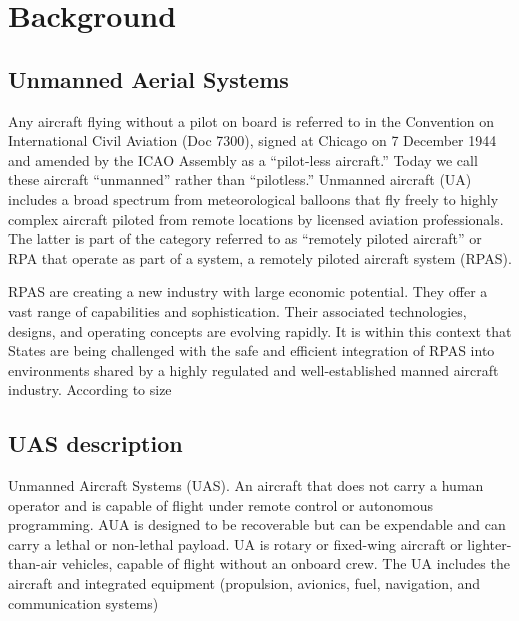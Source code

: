 \section{Background}
\subsection{Unmanned Aerial Systems}
Any aircraft flying without a pilot on board is referred to in the Convention on International Civil Aviation (Doc 7300), signed at Chicago on 7 December 1944 and amended by the ICAO Assembly as a “pilot-less aircraft.” Today we call these aircraft “unmanned” rather than “pilotless.” Unmanned aircraft (UA) includes a broad spectrum from meteorological balloons that fly freely to highly complex aircraft piloted from remote locations by licensed aviation professionals. The latter is part of the category referred to as “remotely piloted aircraft” or RPA that operate as part of a system, a remotely piloted aircraft system (RPAS).

RPAS are creating a new industry with large economic potential. They offer a vast range of capabilities and sophistication. Their associated technologies, designs, and operating concepts are evolving rapidly. It is within this context that States are being challenged with the safe and efficient integration of RPAS into environments shared by a highly regulated and well-established manned aircraft industry. According to size\cite{ICAO}
\subsection{UAS description}
Unmanned Aircraft Systems (UAS). An aircraft that does not carry a human operator and is capable of flight under remote control or autonomous programming. AUA is designed to be recoverable but can be expendable and can carry a lethal or non-lethal payload. UA is rotary or fixed-wing aircraft or lighter-than-air vehicles, capable of flight without an onboard crew. The UA includes the aircraft and integrated equipment (propulsion, avionics, fuel, navigation, and communication systems)\cite{Joint}
